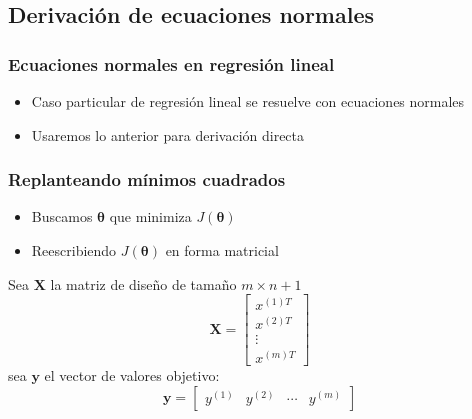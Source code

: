 \documentclass{beamer}
\begin{document}
\subsection{Derivación de ecuaciones normales}
\begin{frame}
\frametitle{Ecuaciones normales en regresión lineal}
\begin{itemize}
\item Caso particular de regresión lineal se resuelve con ecuaciones normales 
\item Usaremos lo anterior para derivación directa
\end{itemize}
\end{frame}

\begin{frame}
\frametitle{Replanteando mínimos cuadrados }
\begin{itemize}
\item Buscamos $\boldsymbol{\theta}$ que minimiza $J(\boldsymbol{\theta})$
\item Reescribiendo $J(\boldsymbol{\theta})$ en forma matricial 
\end{itemize}
Sea $\boldsymbol{X}$ la matriz de diseño de tamaño $m\times n+1$
 \begin{equation*}
 \boldsymbol{X}= \begin{bmatrix} x^{(1)T} \\ x^{(2)T }\\ \vdots \\ x^{(m)T}   \end{bmatrix} 
 \end{equation*}
sea $\boldsymbol{y}$ el vector de valores objetivo:
 \begin{equation*}
 \boldsymbol{y}= \begin{bmatrix} y^{(1)} & y^{(2)} & \cdots & y^{(m)}   \end{bmatrix} 
 \end{equation*}
\end{frame}
\end{document}

